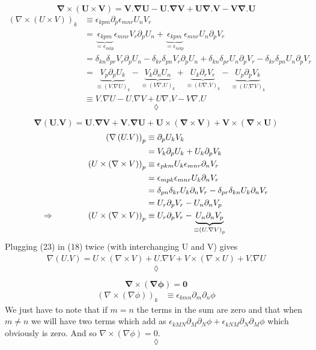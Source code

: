 $$ \mathbf{\nabla \times  \left( U\times V \right) = V . \nabla U -  U . \nabla V+U\nabla . V-V\nabla.U}$$
\begin{align*}
\left(\nabla \times  \left( U\times V \right) \right)_k &\equiv \epsilon_{kpm}\partial_p \epsilon_{mnr}U_n V_r\\
&=  \underbrace{\epsilon_{kpm}}_{= \epsilon_{mkp}}\epsilon_{mnr}V_r\partial_p U_n + \underbrace{\epsilon_{kpm}}_{= \epsilon_{mkp}}\epsilon_{mnr}U_n\partial_p V_r \\
&= \delta_{kn}\delta_{pr}V_r\partial_p U_n -\delta_{kr}\delta_{pn}V_r\partial_p U_n +\delta_{kn}\delta_{pr}U_n\partial_p V_r-\delta_{kr}\delta_{pn}U_n\partial_p V_r\\
&= \underbrace{V_p\partial_p U_k}_{\equiv \left(V .\nabla U\right)_k} -\underbrace{V_k\partial_n U_n}_{\equiv \left(V\nabla .U\right)_k} +\underbrace{U_k\partial_r V_r}_{\equiv \left(U\nabla .V\right)_k}-\underbrace{U_p\partial_p V_k}_{\equiv \left(U .\nabla V\right)_k}\\
&\equiv V .\nabla U-U .\nabla V+U\nabla .V-V\nabla .U
\end{align*}
$$\lozenge$$

$$ \mathbf{\nabla \left( U. V \right) = U . \nabla V + V . \nabla U+U\times\left(\nabla \times V\right)+V\times\left(\nabla \times U\right)}$$
\begin{align*}
\left(\nabla \left( U. V \right) \right)_p &\equiv \partial_p U_k V_k\\
&=  V_k\partial_p U_k +U_k\partial_p  V_k\\
\left(U\times\left(\nabla\times V\right)\right)_p &\equiv \epsilon_{pkm} U_k\epsilon_{mnr}\partial_n V_r\\
&=\epsilon_{mpk} \epsilon_{mnr}U_k\partial_n V_r\\
&=\delta_{pn}\delta_{kr}U_k\partial_n V_r-\delta_{pr}\delta_{kn}U_k\partial_n V_r\\
&=U_r\partial_p V_r-U_n\partial_n V_p\\
\Rightarrow\quad\quad\quad\quad \left(U\times\left(\nabla\times V\right)\right)_p &\equiv U_r\partial_p V_r-\underbrace{U_n\partial_n V_p}_{\equiv \left(U.\nabla V\right)_p}
\end{align*}
Plugging (23) in (18) twice (with interchanging U and V) gives
\begin{align*}
\nabla \left( U. V \right)  =U\times\left(\nabla\times V\right)+U.\nabla V+V\times\left(\nabla\times U\right)+V.\nabla U
\end{align*}
$$\lozenge$$

$$ \mathbf{\nabla \times \left(\nabla\phi \right) = 0}$$
\begin{align*}
\left(\nabla \times \left(\nabla\phi \right)\right)_k&\equiv \epsilon_{kmn}\partial_m \partial_n\phi
\end{align*}
We just have to note that if $m=n$ the terms in the sum are zero and that when $m\ne n$ we will have two terms which add as $\epsilon_{kMN}\partial_M \partial_N\phi + \epsilon_{kNM}\partial_N \partial_M\phi $ which obviously is zero. And so $\nabla \times \left(\nabla\phi \right) = 0$.
$$\lozenge$$

